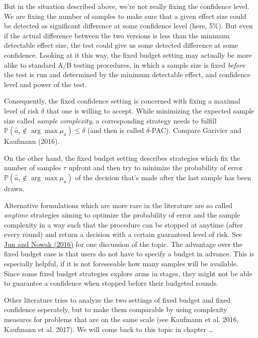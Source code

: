 \documentclass[12pt,]{article}
\begin{document}
But in the situation described above, we're not really fixing the
confidence level. We are fixing the number of samples to make sure that
a given effect size could be detected as significant difference at some
confidence level (here, 5\%). But even if the actual difference between
the two versions is less than the minimum detectable effect size, the
test could give us some detected difference at some confidence. Looking
at it this way, the fixed budget setting may actually be more alike to
standard A/B testing procedures, in which a sample size is fixed
\emph{before} the test is run and determined by the minimum detectable
effect, and confidence level and power of the test.

Consequently, the fixed confidence setting is concerned with fixing a
maximal level of risk \(\delta\) that one is willing to accept. While
minimizing the expected sample size called \emph{sample complexity}, a
corresponding strategy needs to fulfill
\(\mathbb{P}(\hat{a}_\tau \notin \arg \max \mu_a)\leq \delta\) (and then
is called \(\delta\)-PAC). Compare Garivier and Kaufmann (2016).

On the other hand, the fixed budget setting describes strategies which
fix the number of samples \(\tau\) upfront and then try to minimize the
probability of error \(\mathbb{P}(\hat{a}_\tau \notin \arg \max \mu_a)\)
of the decision that's made after the last sample has been drawn.

Alternative formulations which are more rare in the literature are so
called \emph{anytime} strategies aiming to optimize the probability of
error and the sample complexity in a way such that the procedure can be
stopped at anytime (after every round) and return a decision with a
certain guaranteed level of risk. See
\href{http://proceedings.mlr.press/v48/jun16-supp.pdf}{Jun and Nowak
(2016)} for one discussion of the topic. The advantage over the fixed
budget case is that users do not have to specify a budget in advance.
This is especially helpful, if it is not foreseeable how many samples
will be available. Since some fixed budget strategies explore arms in
stages, they might not be able to guarantee a confidence when stopped
before their budgeted rounds.

Other literature tries to analyze the two settings of fixed budget and
fixed confidence seperately, but to make them comparable by using
complexity measures for problems that are on the same scale (see
Kaufmann et al. 2016, Kaufmann et al. 2017). We will come back to this
topic in chapter \ldots{}
\end{document}
